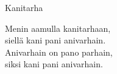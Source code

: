 \begin{song}{Kanitarha}

	
	Menin aamulla kanitarhaan,\\
	siellä kani pani anivarhain.\\
	Anivarhain on pano parhain,\\
	siksi kani pani anivarhain.
	
\end{song}
